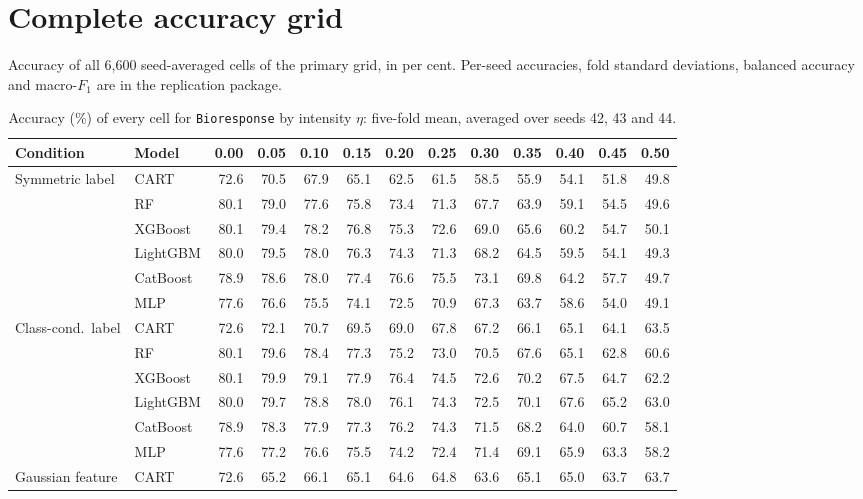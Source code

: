\documentclass[pdflatex,sn-mathphys]{sn-jnl}
\theoremstyle{thmstyleone}
\begin{document}
\section{Complete accuracy grid}\label{sup:grids}
Accuracy of all 6{,}600 seed-averaged cells of the primary grid, in per cent. Per-seed accuracies, fold standard deviations, balanced accuracy and macro-$F_1$ are in the replication package.
\begin{table}[htbp]
\centering
\tiny
\setlength{\tabcolsep}{2.6pt}
\caption{Accuracy (\%) of every cell for \texttt{Bioresponse} by intensity $\eta$: five-fold mean, averaged over seeds 42, 43 and 44.}
\label{tab:grid_Bioresponse}
\begin{tabular}{@{}llrrrrrrrrrrr@{}}
\toprule
Condition & Model & 0.00 & 0.05 & 0.10 & 0.15 & 0.20 & 0.25 & 0.30 & 0.35 & 0.40 & 0.45 & 0.50 \\
\midrule
Symmetric label & CART & 72.6 & 70.5 & 67.9 & 65.1 & 62.5 & 61.5 & 58.5 & 55.9 & 54.1 & 51.8 & 49.8 \\
 & RF & 80.1 & 79.0 & 77.6 & 75.8 & 73.4 & 71.3 & 67.7 & 63.9 & 59.1 & 54.5 & 49.6 \\
 & XGBoost & 80.1 & 79.4 & 78.2 & 76.8 & 75.3 & 72.6 & 69.0 & 65.6 & 60.2 & 54.7 & 50.1 \\
 & LightGBM & 80.0 & 79.5 & 78.0 & 76.3 & 74.3 & 71.3 & 68.2 & 64.5 & 59.5 & 54.1 & 49.3 \\
 & CatBoost & 78.9 & 78.6 & 78.0 & 77.4 & 76.6 & 75.5 & 73.1 & 69.8 & 64.2 & 57.7 & 49.7 \\
 & MLP & 77.6 & 76.6 & 75.5 & 74.1 & 72.5 & 70.9 & 67.3 & 63.7 & 58.6 & 54.0 & 49.1 \\
\midrule
Class-cond.\ label & CART & 72.6 & 72.1 & 70.7 & 69.5 & 69.0 & 67.8 & 67.2 & 66.1 & 65.1 & 64.1 & 63.5 \\
 & RF & 80.1 & 79.6 & 78.4 & 77.3 & 75.2 & 73.0 & 70.5 & 67.6 & 65.1 & 62.8 & 60.6 \\
 & XGBoost & 80.1 & 79.9 & 79.1 & 77.9 & 76.4 & 74.5 & 72.6 & 70.2 & 67.5 & 64.7 & 62.2 \\
 & LightGBM & 80.0 & 79.7 & 78.8 & 78.0 & 76.1 & 74.3 & 72.5 & 70.1 & 67.6 & 65.2 & 63.0 \\
 & CatBoost & 78.9 & 78.3 & 77.9 & 77.3 & 76.2 & 74.3 & 71.5 & 68.2 & 64.0 & 60.7 & 58.1 \\
 & MLP & 77.6 & 77.2 & 76.6 & 75.5 & 74.2 & 72.4 & 71.4 & 69.1 & 65.9 & 63.3 & 58.2 \\
\midrule
Gaussian feature & CART & 72.6 & 65.2 & 66.1 & 65.1 & 64.6 & 64.8 & 63.6 & 65.1 & 65.0 & 63.7 & 63.7 \\

\end{tabular}
\end{table}
\end{document}
